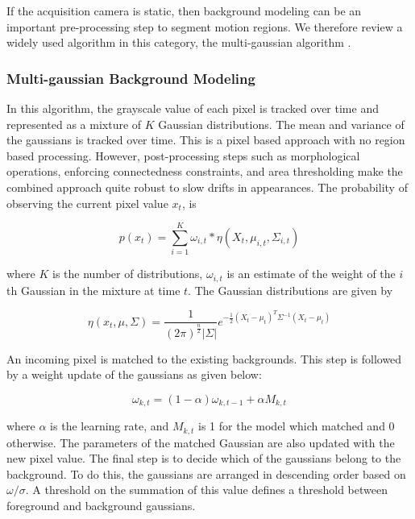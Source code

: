 \documentclass[12pt,letterpaper,doublespaced,ETD,proposal]{gt-ece-thesis}
\begin{document}
\begin{Body}
If the acquisition camera is static, then background modeling can be an important pre-processing step to segment motion regions.  We therefore review a widely used algorithm in this category, the multi-gaussian algorithm \cite{2000_JNL_MG_Stauffer}.

\subsubsection{Multi-gaussian Background Modeling}
In this algorithm, the grayscale value of each pixel is tracked over time and represented as a mixture of $K$ Gaussian distributions.  The mean and variance of the gaussians is tracked over time.  This is a pixel based approach with no region based processing.  However, post-processing steps such as morphological operations, enforcing connectedness constraints, and area thresholding make the combined approach quite robust to slow drifts in appearances.  The probability of observing the current pixel value $x_t$, is 

\begin{equation}
p(x_t)=\sum_{i=1}^{K}\omega_{i,t}*\eta(X_t, \mu_{i,t}, \Sigma_{i,t})
\end{equation}

where $K$ is the number of distributions,  $\omega_{i,t}$ is an estimate of the weight of the $i$th Gaussian in the mixture at time $t$.  The Gaussian distributions are given by

\begin{equation}
\eta(x_t, \mu, \Sigma)=\frac{1}{(2\pi)^\frac{n}{2}|\Sigma|}e^{-\frac{1}{2}(X_t-\mu_t)^T\Sigma^{-1}(X_t-\mu_t)}
\end{equation}

An incoming pixel is matched to the existing backgrounds.  This step is followed by a weight update of the gaussians as given below:

\begin{equation}
\omega_{k,t} = (1-\alpha) \omega_{k,t-1} + \alpha M_{k,t}
\end{equation}

where $\alpha$ is the learning rate, and $M_{k,t}$ is 1 for the model which matched and 0 otherwise.  The parameters of the matched Gaussian are also updated with the new pixel value.  The final step is to decide which of the gaussians belong to the background.  To do this, the gaussians are arranged in descending order based on $\omega / \sigma$.  A threshold on the summation of this value defines a threshold between foreground and background gaussians.


\end{Body}
\end{document}
